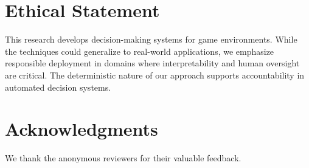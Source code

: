 \documentclass[letterpaper]{article}
\begin{document}
\section*{Ethical Statement}

This research develops decision-making systems for game environments. While the techniques could generalize to real-world applications, we emphasize responsible deployment in domains where interpretability and human oversight are critical. The deterministic nature of our approach supports accountability in automated decision systems.

\section*{Acknowledgments}

We thank the anonymous reviewers for their valuable feedback.


\end{document}
